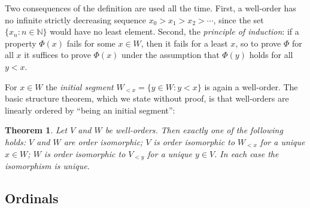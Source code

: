 \documentclass[12pt]{article}
\newtheorem{theorem}{Theorem}[section]
\theoremstyle{definition}
\theoremstyle{remark}
\newcommand{\NN}{\mathbb{N}}
\begin{document}
Two consequences of the definition are used all the time. First, a well-order
has no infinite strictly decreasing sequence $x_0>x_1>x_2>\cdots$, since the
set $\{x_n:n\in\NN\}$ would have no least element. Second, the
\emph{principle of induction}: if a property $\Phi(x)$ fails for some
$x\in W$, then it fails for a least $x$, so to prove $\Phi$ for all $x$ it
suffices to prove $\Phi(x)$ under the assumption that $\Phi(y)$ holds for all
$y<x$.

For $x\in W$ the \emph{initial segment} $W_{<x}=\{y\in W:y<x\}$ is again a
well-order. The basic structure theorem, which we state without proof, is
that well-orders are linearly ordered by ``being an initial segment'':

\begin{theorem}\label{ComparabilityOfWellOrders} Let $V$ and $W$ be
    well-orders. Then exactly one of the following holds: $V$ and $W$ are
    order isomorphic; $V$ is order isomorphic to $W_{<x}$ for a unique
    $x\in W$; $W$ is order isomorphic to $V_{<y}$ for a unique $y\in V$. In
    each case the isomorphism is unique.
\end{theorem}

\subsection{Ordinals}
\end{document}

